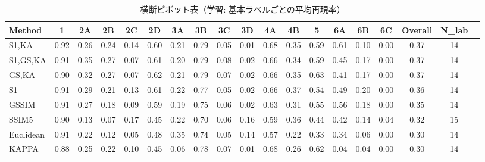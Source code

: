 \documentclass{jarticle}
\theoremstyle{definition}
\begin{document}
\begin{table*}[t!]
\centering
\caption{横断ピボット表（学習: 基本ラベルごとの平均再現率）}
\label{tab:pivot_train}
\scriptsize
\setlength{\tabcolsep}{3pt}
\begin{tabular}{lcccccccccccccccccc}
\hline
Method & 1 & 2A & 2B & 2C & 2D & 3A & 3B & 3C & 3D & 4A & 4B & 5 & 6A & 6B & 6C & Overall & N\_lab \\
\hline
S1,KA      & 0.92 & 0.26 & 0.24 & 0.14 & 0.60 & 0.21 & 0.79 & 0.05 & 0.01 & 0.68 & 0.35 & 0.59 & 0.61 & 0.10 & 0.00 & 0.37 & 14 \\
S1,GS,KA   & 0.91 & 0.35 & 0.27 & 0.07 & 0.61 & 0.20 & 0.79 & 0.08 & 0.02 & 0.66 & 0.34 & 0.59 & 0.45 & 0.17 & 0.00 & 0.37 & 14 \\
GS,KA      & 0.90 & 0.32 & 0.27 & 0.07 & 0.62 & 0.21 & 0.79 & 0.07 & 0.02 & 0.66 & 0.35 & 0.63 & 0.41 & 0.17 & 0.00 & 0.37 & 14 \\
S1         & 0.91 & 0.29 & 0.21 & 0.13 & 0.61 & 0.22 & 0.77 & 0.05 & 0.02 & 0.66 & 0.37 & 0.54 & 0.49 & 0.20 & 0.00 & 0.36 & 14 \\
GSSIM      & 0.91 & 0.27 & 0.18 & 0.09 & 0.59 & 0.19 & 0.75 & 0.06 & 0.02 & 0.63 & 0.31 & 0.55 & 0.56 & 0.18 & 0.00 & 0.35 & 14 \\
SSIM5      & 0.90 & 0.13 & 0.07 & 0.17 & 0.45 & 0.22 & 0.70 & 0.06 & 0.16 & 0.59 & 0.36 & 0.44 & 0.42 & 0.14 & 0.04 & 0.32 & 15 \\
Euclidean  & 0.91 & 0.22 & 0.12 & 0.05 & 0.48 & 0.35 & 0.74 & 0.05 & 0.14 & 0.57 & 0.22 & 0.33 & 0.34 & 0.06 & 0.00 & 0.30 & 14 \\
KAPPA      & 0.88 & 0.25 & 0.22 & 0.10 & 0.45 & 0.06 & 0.78 & 0.07 & 0.01 & 0.68 & 0.26 & 0.62 & 0.04 & 0.04 & 0.00 & 0.30 & 14 \\
\hline
\end{tabular}
\end{table*}
\end{document}

